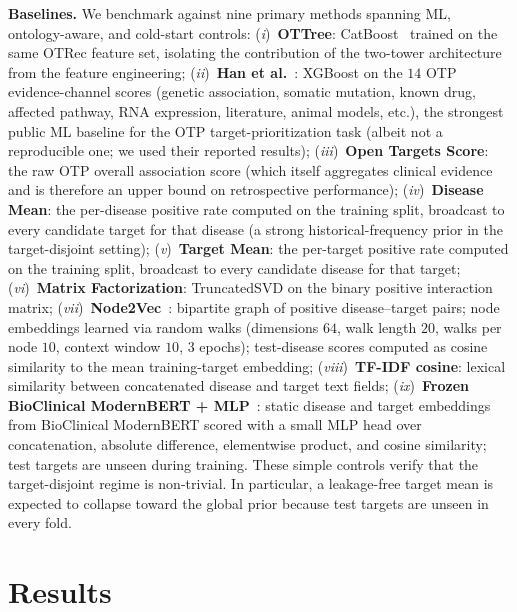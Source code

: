 \documentclass{article}
\begin{document}
\textbf{Baselines.}
We benchmark against nine primary methods spanning ML, ontology-aware,
and cold-start controls:
(\textit{i})~\textbf{OTTree}: CatBoost~\citep{dorogush2018} trained on
the same OTRec feature set, isolating the contribution of the
two-tower architecture from the feature engineering;
(\textit{ii})~\textbf{Han et al.}~\citep{han2022}: XGBoost on the
$14$ OTP evidence-channel scores (genetic association, somatic
mutation, known drug, affected pathway, RNA expression, literature,
animal models, etc.), the strongest public ML
baseline for the OTP target-prioritization task (albeit not a reproducible one; we used their reported results);
(\textit{iii})~\textbf{Open Targets Score}: the raw OTP overall
association score (which itself aggregates clinical evidence and is
therefore an upper bound on retrospective performance);
(\textit{iv})~\textbf{Disease Mean}: the per-disease positive rate
computed on the training split, broadcast to every candidate target
for that disease (a strong historical-frequency prior in the
target-disjoint setting);
(\textit{v})~\textbf{Target Mean}: the per-target positive rate
computed on the training split, broadcast to every candidate disease
for that target;
(\textit{vi})~\textbf{Matrix Factorization}: TruncatedSVD on the
binary positive interaction matrix;
(\textit{vii})~\textbf{Node2Vec}~\citep{grover2016node2vec}: bipartite graph of positive disease--target pairs; node embeddings learned via random walks (dimensions $64$, walk length $20$, walks per node $10$, context window $10$, $3$ epochs); test-disease scores computed as cosine similarity to the mean training-target embedding;
(\textit{viii})~\textbf{TF-IDF cosine}: lexical similarity between
concatenated disease and target text fields;
(\textit{ix})~\textbf{Frozen BioClinical ModernBERT + MLP}~\citep{sounack_bioclinical_2025}: static disease and target embeddings from BioClinical ModernBERT scored with a small MLP head over concatenation, absolute difference, elementwise product, and cosine similarity; test targets are unseen during training.
These simple controls verify that the
target-disjoint regime is non-trivial. In particular, a leakage-free
target mean is expected to collapse toward the global prior because
test targets are unseen in every fold.%

\section{Results}
\label{sec:results}
\end{document}
